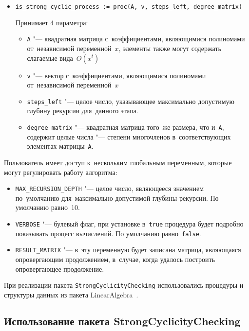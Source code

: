 \begin{itemize}
    \item
        \verb|is_strong_cyclic_process := proc(A, v, steps_left, degree_matrix)|

        Принимает 4 параметра:
        \begin{itemize}
            \item
                \verb|A| "--- квадратная матрица с~коэффициентами, являющимися полиномами от~независимой переменной~$x$,
                элементы также могут содержать слагаемые вида~$O(x^t)$
            \item
                \verb|v| "--- вектор с~коэффициентами, являющимися полиномами от~независимой переменной~$x$
            \item
                \verb|steps_left| "--- целое число,
                указывающее максимально допустимую глубину рекурсии для~данного этапа.
            \item
                \verb|degree_matrix| "--- квадратная матрица того~же размера, что и~\verb|A|,
                содержит целые числа "--- степени многочленов в~соответствующих элементах матрицы~\verb|A|.
        \end{itemize}
\end{itemize}


Пользователь имеет доступ к~нескольким глобальным переменным, которые могут регулировать работу алгоритма:
\begin{itemize}
    \item
        \verb|MAX_RECURSION_DEPTH| "--- целое число, являющееся значением по~умолчанию для~максимально допустимой глубины рекурсии.
        По умолчанию равно~10.
    \item
        \verb|VERBOSE| "--- булевый флаг, при установке в~\verb|true| процедура будет подробно показывать процесс вычислений.
        По умолчанию равно~\verb|false|.
    \item
        \verb|RESULT_MATRIX| "--- в~эту переменную будет записана матрица, являющаяся опровергающим продолжением,
        в~случае, когда удалось построить опровергающее продолжение.
\end{itemize}


При реализации пакета \verb|StrongCyclicityChecking| использовались
процедуры и структуры данных из пакета LinearAlgebra~\cite{litMapleLinearAlgebra}.


\newpage
\subsection{Использование пакета StrongCyclicityChecking}

